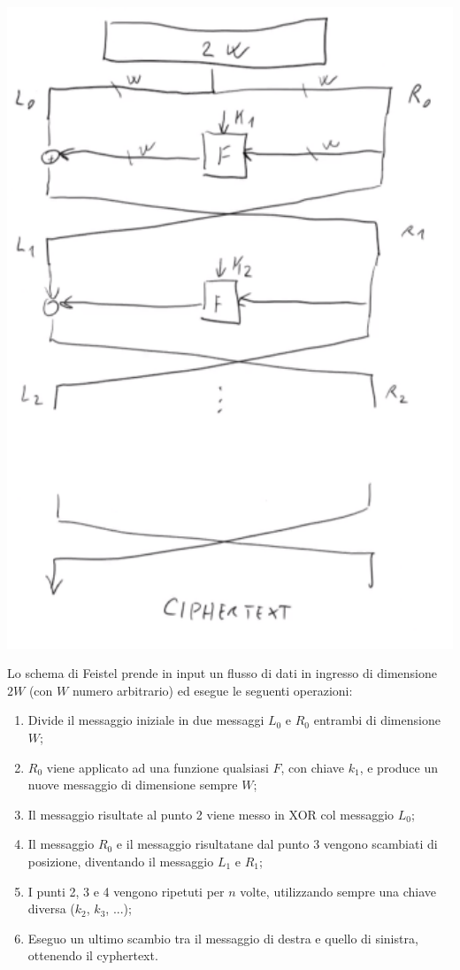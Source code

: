 \begin{center}
    \includegraphics[width=1\textwidth]{images/3.png}
\end{center}

Lo schema di Feistel prende in input un flusso di dati in ingresso di dimensione $2W$ (con $W$ numero arbitrario) ed esegue le seguenti operazioni:
\begin{enumerate}
    \item Divide il messaggio iniziale in due messaggi $L_0$ e $R_0$ entrambi di dimensione $W$;
    \item $R_0$ viene applicato ad una funzione qualsiasi $F$, con chiave $k_1$, e produce un nuove messaggio di dimensione sempre $W$;
    \item Il messaggio risultate al punto 2 viene messo in XOR col messaggio $L_0$;
    \item Il messaggio $R_0$ e il messaggio risultatane dal punto 3 vengono scambiati di posizione, diventando il messaggio $L_1$ e $R_1$;
    \item I punti 2, 3 e 4 vengono ripetuti per $n$ volte, utilizzando sempre una chiave diversa ($k_2$, $k_3$, ...);
    \item Eseguo un ultimo scambio tra il messaggio di destra e quello di sinistra, ottenendo il cyphertext.
\end{enumerate}

